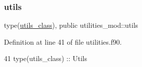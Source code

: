 \subsubsection{\texorpdfstring{utils}{utils}}
{\footnotesize\ttfamily type(\mbox{\hyperlink{structutilities__mod_1_1utils__class}{utils\+\_\+class}}), public utilities\+\_\+mod\+::utils}



Definition at line 41 of file utilities.\+f90.


\begin{DoxyCode}
41     \textcolor{keywordtype}{type}(utils\_class) :: Utils
\end{DoxyCode}
